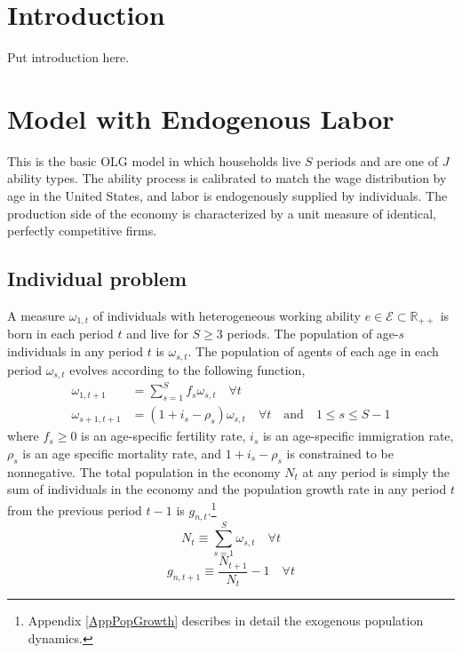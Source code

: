 \documentclass[letterpaper,12pt]{article}
\theoremstyle{definition}
\begin{document}
\begin{spacing}{1.5}

\section{Introduction}\label{SecIntro}

  Put introduction here.


\section{Model with Endogenous Labor}\label{SecModel}

  This is the basic OLG model in which households live $S$ periods and are one of $J$ ability types. The ability process is calibrated to match the wage distribution by age in the United States, and labor is endogenously supplied by individuals. The production side of the economy is characterized by a unit measure of identical, perfectly competitive firms.


  \subsection{Individual problem}\label{SecIndProb}

    A measure $\omega_{1,t}$ of individuals with heterogeneous working ability $e \in\mathcal{E}\subset\mathbb{R}_{++}$ is born in each period $t$ and live for $S\geq 3$ periods. The population of age-$s$ individuals in any period $t$ is $\omega_{s,t}$. The population of agents of each age in each period $\omega_{s,t}$ evolves according to the following function,
    \begin{equation}\label{EqPopLawofmotion}
      \begin{split}
        \omega_{1,t+1} &= \sum_{s=1}^S f_s\omega_{s,t}\quad\forall t \\
        \omega_{s+1,t+1} &= (1 + i_s - \rho_s)\omega_{s,t}\quad\forall t\quad\text{and}\quad 1\leq s \leq S-1
      \end{split}
    \end{equation}
    where $f_s\geq 0$ is an age-specific fertility rate, $i_s$ is an age-specific immigration rate, $\rho_s$ is an age specific mortality rate, and $1+i_s-\rho_s$ is constrained to be nonnegative. The total population in the economy $N_t$ at any period is simply the sum of individuals in the economy and the population growth rate in any period $t$ from the previous period $t-1$ is $g_{n,t}$.\footnote{Appendix \ref{AppPopGrowth} describes in detail the exogenous population dynamics.}
    \begin{equation}\label{EqPopDef}
      N_t\equiv\sum_{s=1}^S \omega_{s,t} \quad\forall t
    \end{equation}
    \begin{equation}\label{EqPopGrowth}
      g_{n,t+1} \equiv \frac{N_{t+1}}{N_t} - 1 \quad\forall t
    \end{equation}


\end{spacing}
\end{document}
